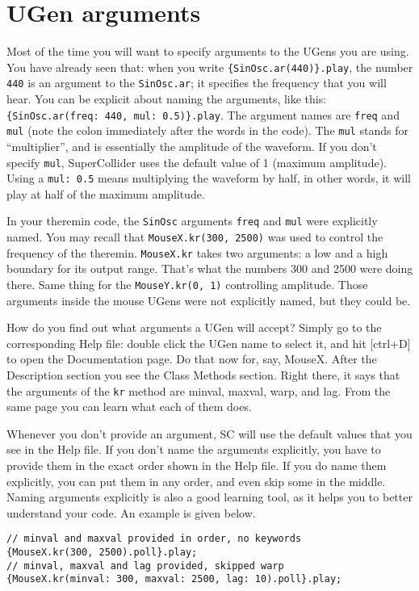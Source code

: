 \section{UGen arguments}

Most of the time you will want to specify arguments to the UGens you are using. You have already seen that: when you write \texttt{\{SinOsc.ar(440)\}.play}, the number \texttt{440} is an argument to the \texttt{SinOsc.ar}; it specifies the frequency that you will hear. You can be explicit about naming the arguments, like this: \texttt{\{SinOsc.ar(freq: 440, mul: 0.5)\}.play}. The argument names are \texttt{freq} and \texttt{mul} (note the colon immediately after the words in the code). The \texttt{mul} stands for ``multiplier'', and is essentially the amplitude of the waveform. If you don't specify \texttt{mul}, SuperCollider uses the default value of 1 (maximum amplitude). Using a \texttt{mul: 0.5} means multiplying the waveform by half, in other words, it will play at half of the maximum amplitude.

In your theremin code, the \texttt{SinOsc} arguments \texttt{freq} and \texttt{mul} were explicitly named. You may recall that  \texttt{MouseX.kr(300, 2500)} was used to control the frequency of the theremin. \texttt{MouseX.kr} takes two arguments: a low and a high boundary for its output range. That's what the numbers 300 and 2500 were doing there. Same thing for the \texttt{MouseY.kr(0, 1)} controlling amplitude. Those arguments inside the mouse UGens were not explicitly named, but they could be.

How do you find out what arguments a UGen will accept? Simply go to the corresponding Help file: double click the UGen name to select it, and hit [ctrl+D] to open the Documentation page. Do that now for, say, MouseX. After the Description section you see the Class Methods section. Right there, it says that the arguments of the \texttt{kr} method are minval, maxval, warp, and lag. From the same page you can learn what each of them does.

Whenever you don't provide an argument, SC will use the default values that you see in the Help file. If you don't name the arguments explicitly, you have to provide them in the exact order shown in the Help file. If you do name them explicitly, you can put them in any order, and even skip some in the middle. Naming arguments explicitly is also a good learning tool, as it helps you to better understand your code. An example is given below.

\begin{lstlisting}[style=SuperCollider-IDE, basicstyle=\scttfamily\footnotesize]
// minval and maxval provided in order, no keywords
{MouseX.kr(300, 2500).poll}.play;
// minval, maxval and lag provided, skipped warp
{MouseX.kr(minval: 300, maxval: 2500, lag: 10).poll}.play;
\end{lstlisting}